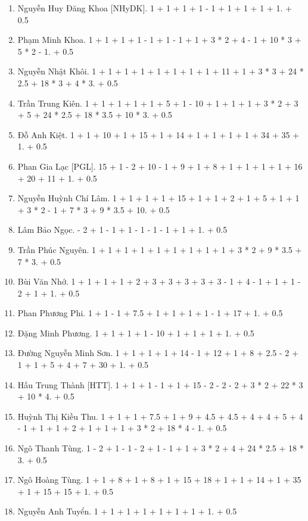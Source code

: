 \documentclass{article}
\begin{document}
\begin{enumerate}
	\item {\sc Nguyễn Huy Đăng Khoa [NHyDK].} 1 + 1 + 1 + 1 - 1 + 1 + 1 + 1 + 1. + 0.5
	\item {\sc Phạm Minh Khoa.} 1 + 1 + 1 + 1 - 1 + 1 - 1 + 1 + 3 * 2 + 4 - 1 + 10 * 3 + 5 * 2 - 1. + 0.5
	\item {\sc Nguyễn Nhật Khôi.} 1 + 1 + 1 + 1 + 1 + 1 + 1 + 1 + 11 + 1 + 3 * 3 + 24 * 2.5 + 18 * 3 + 4 * 3. + 0.5
	\item {\sc Trần Trung Kiên.} 1 + 1 + 1 + 1 + 1 + 5 + 1 - 10 + 1 + 1 + 1 + 3 * 2 + 3 + 5 + 24 * 2.5 + 18 * 3.5 + 10 * 3. + 0.5
	\item {\sc Đỗ Anh Kiệt.} 1 + 1 + 10 + 1 + 15 + 1 + 14 + 1 + 1 + 1 + 1 + 34 + 35 + 1. + 0.5
	\item {\sc Phan Gia Lạc [PGL].} 15 + 1 - 2 + 10 - 1 + 9 + 1 + 8 + 1 + 1 + 1 + 1 + 16 + 20 + 11 + 1. + 0.5
	\item {\sc Nguyễn Huỳnh Chí Lâm.} 1 + 1 + 1 + 1 +  15 + 1 + 1 + 2 + 1 + 5 + 1 + 1 + 3 * 2 - 1 + 7 * 3 + 9 * 3.5 + 10. + 0.5
	\item {\sc Lâm Bảo Ngọc.} - 2 + 1 - 1 + 1 - 1 - 1 - 1 + 1 + 1. + 0.5
	\item {\sc Trần Phúc Nguyên.} 1 + 1 + 1 + 1 + 1 + 1 + 1 + 1 + 1 + 3 * 2 + 9 * 3.5 + 7 * 3. + 0.5
	\item {\sc Bùi Văn Nhớ.} 1 + 1 + 1 + 1 + 2 + 3 + 3 + 3 + 3 + 3 - 1 + 4 - 1 + 1 + 1 - 2 + 1 + 1. + 0.5
	\item {\sc Phan Phương Phi.} 1 + 1 - 1 + 7.5 + 1 + 1 + 1 + 1 - 1 + 17 + 1. + 0.5
	\item {\sc Đặng Minh Phương.} 1 + 1 + 1 + 1 - 10 + 1 + 1 + 1 + 1. + 0.5
	\item {\sc Đường Nguyễn Minh Sơn.} 1 + 1 + 1 + 1 + 14 - 1 + 12 + 1 + 8 + 2.5 - 2 + 1 + 1 + 5 + 4 + 7 + 30 + 1. + 0.5
	\item {\sc Hấu Trung Thành [HTT].} 1 + 1 + 1 - 1 + 1 + 15 - 2 - 2 - 2 + 3 * 2 + 22 * 3 + 10 * 4. + 0.5
	\item {\sc Huỳnh Thị Kiều Thu.} 1 + 1 + 1 + 7.5 + 1 + 9 + 4.5 + 4.5 + 4 + 4 + 5 + 4 - 1 + 1 + 1 + 2 + 1 + 1 + 1 + 3 * 2 + 18 * 4 - 1. + 0.5
	\item {\sc Ngô Thanh Tùng.} 1 - 2 + 1 - 1 - 2 + 1 - 1 + 1 + 3 * 2 + 4 + 24 * 2.5 + 18 * 3. + 0.5
	\item {\sc Ngô Hoàng Tùng.} 1 + 1 + 8 + 1 + 8 + 1 + 15 + 18 + 1 + 1 + 14 + 1 + 35 + 1 + 15 + 15 + 1. + 0.5
	\item {\sc Nguyễn Anh Tuyển.} 1 + 1 + 1 + 1 + 1 + 1 + 1 + 1. + 0.5
\end{enumerate}
\end{document}
